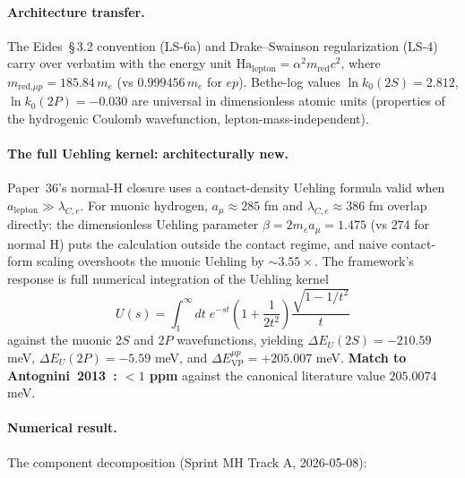\documentclass[11pt]{article}
\begin{document}
\paragraph{Architecture transfer.}  The Eides~\S\,3.2 convention
(LS-6a) and Drake--Swainson regularization (LS-4) carry over verbatim
with the energy unit
$\text{Ha}_\text{lepton} = \alpha^2 m_\text{red} c^2$, where
$m_\text{red,$\mu p$} = 185.84\, m_e$ (vs $0.999456\, m_e$ for $ep$).
Bethe-log values $\ln k_0(2S) = 2.812$, $\ln k_0(2P) = -0.030$ are
universal in dimensionless atomic units (properties of the hydrogenic
Coulomb wavefunction, lepton-mass-independent).

\paragraph{The full Uehling kernel: architecturally new.}  Paper~36's
normal-H closure uses a contact-density Uehling formula valid when
$a_\text{lepton} \gg \lambda_{C,e}$.  For muonic hydrogen,
$a_\mu \approx 285$ fm and $\lambda_{C,e} \approx 386$ fm overlap
directly: the dimensionless Uehling parameter $\beta = 2 m_e a_\mu
= 1.475$ (vs $274$ for normal H) puts the calculation outside the
contact regime, and naive contact-form scaling overshoots the muonic
Uehling by $\sim 3.55\times$.  The framework's response is full
numerical integration of the Uehling kernel
\begin{equation}
U(s) = \int_1^\infty \!\! dt \; e^{-st}
\left(1 + \frac{1}{2t^2}\right)
\frac{\sqrt{1 - 1/t^2}}{t}
\label{eq:uehling_kernel}
\end{equation}
against the muonic 2$S$ and 2$P$ wavefunctions, yielding
$\Delta E_U(2S) = -210.59$ meV, $\Delta E_U(2P) = -5.59$ meV, and
$\Delta E^{\mu p}_\text{VP} = +205.007$ meV.  \textbf{Match to
Antognini~2013~\cite{antognini2013}: $<1$ ppm} against the canonical literature value
$205.0074$ meV.

\paragraph{Numerical result.}  The component decomposition
(Sprint MH Track A, 2026-05-08):
\end{document}
